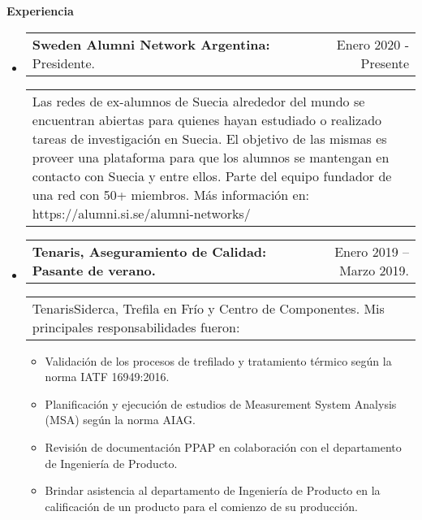 \documentclass[a4paper,10pt]{article}
\begin{document}
{\Large \textbf{Experiencia}}
   \vspace{-1.5mm}
    \begin{itemize}
      \setlength{\itemsep}{3pt}
      \setlength{\parskip}{0pt}
      \setlength{\parsep}{0pt}
             \item
        \begin{tabular*}{6.9in}{l@{\extracolsep{\fill}}r}
            \textbf{Sweden Alumni Network Argentina: }Presidente. & Enero 2020 - Presente\\
        \end{tabular*}
        \begin{tabular}{m{16cm} c}
            Las redes de ex-alumnos de Suecia alrededor del mundo se encuentran abiertas para quienes hayan estudiado o realizado tareas de investigación en Suecia. El objetivo de las mismas es proveer una plataforma para que los alumnos se mantengan en contacto con Suecia y entre ellos. Parte del equipo fundador de una red con 50+ miembros. Más información en: https://alumni.si.se/alumni-networks/
        \end{tabular}
      
              \item
        \begin{tabular*}{6.9in}{l@{\extracolsep{\fill}}r}
            \textbf{{Tenaris, Aseguramiento de Calidad:} Pasante de verano.} & Enero 2019 – Marzo 2019.\\
        \end{tabular*}
        \begin{tabular}{m{16cm} c}
            TenarisSiderca, Trefila en Frío y Centro de Componentes. Mis principales responsabilidades fueron:
        \end{tabular}
                 \begin{itemize}
                      \setlength{\itemsep}{2.2pt}
                      \setlength{\parskip}{0pt}
                      \setlength{\parsep}{0pt}
                        \item Validación de los procesos de trefilado y tratamiento térmico según la norma IATF 16949:2016.\\
                        \item Planificación y ejecución de estudios de Measurement System Analysis (MSA) según la norma AIAG. \\
                        \item Revisión de documentación PPAP en colaboración con el departamento de Ingeniería de Producto. \\
                        \item Brindar asistencia al departamento de Ingeniería de Producto en la calificación de un producto para el comienzo de su producción.  \\
                \end{itemize}     


\end{itemize}
\end{document}
